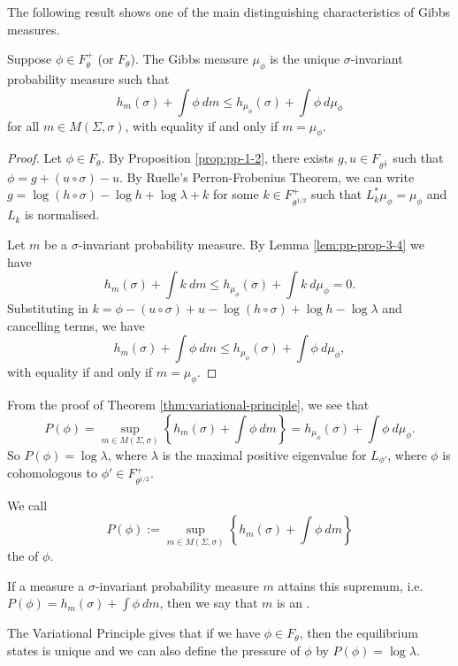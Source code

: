 The following result shows one of the main distinguishing characteristics of Gibbs measures.

\begin{theorem} \label{thm:variational-principle}
	Suppose $\phi \in F_\theta^+$ (or $F_\theta$). The Gibbs measure $\mu_\phi$ is the unique $\sigma$-invariant probability measure such that
	\[
		h_m(\sigma) + \int{\phi\ dm} \leq h_{\mu_\phi}(\sigma) + \int{\phi\ d\mu_\phi}
	\]
	for all $m \in M(\Sigma, \sigma)$, with equality if and only if $m = \mu_\phi$.
	\begin{proof}
		Let $\phi \in F_\theta$. By Proposition \ref{prop:pp-1-2}, there exists $g, u \in F_{\theta^{\frac{1}{2}}}$ such that $\phi = g + (u \circ \sigma) - u$. By Ruelle's Perron-Frobenius Theorem, we can write $g = \log(h \circ \sigma) - \log{h} + \log{\lambda} + k$ for some $k \in F_{\theta^{1/2}}^+$ such that $L_k^*{\mu_\phi} = \mu_\phi$ and $L_k$ is normalised.
		
		Let $m$ be a $\sigma$-invariant probability measure. By Lemma \ref{lem:pp-prop-3-4} we have
		\[
			h_m(\sigma) + \int{k\ dm} \leq h_{\mu_\phi}(\sigma) + \int{k\ d\mu_\phi} = 0.
		\]
		Substituting in $k = \phi - (u \circ \sigma) + u - \log(h \circ \sigma) + \log{h} - \log{\lambda}$ and cancelling terms, we have
		\[
			h_m(\sigma) + \int{\phi\ dm} \leq h_{\mu_\phi}(\sigma) + \int{\phi\ d\mu_\phi},
		\]
		with equality if and only if $m = \mu_\phi$.
	\end{proof}
\end{theorem}

From the proof of Theorem \ref{thm:variational-principle}, we see that
\[
	P(\phi) = \sup_{m \in M(\Sigma, \sigma)}\left\{h_m(\sigma) + \int{\phi\ dm}\right\} = h_{\mu_\phi}(\sigma) + \int{\phi\ d\mu_\phi}.
\]
So $P(\phi) = \log{\lambda}$, where $\lambda$ is the maximal positive eigenvalue for $L_{\phi'}$, where $\phi$ is cohomologous to $\phi' \in F_{\theta^{1 / 2}}^+$.

\begin{definition}
	We call
	\[
		P(\phi) := \sup_{m \in M(\Sigma, \sigma)}\left\{h_m(\sigma) + \int{\phi\ dm}\right\}
	\]
	the  of $\phi$.
	
	If a measure a $\sigma$-invariant probability measure $m$ attains this supremum, i.e. $P(\phi) = h_m(\sigma) + \int{\phi\ dm}$, then we say that $m$ is an .
\end{definition}

The Variational Principle gives that if we have $\phi \in F_\theta$, then the equilibrium states is unique and we can also define the pressure of $\phi$ by $P(\phi) = \log{\lambda}$.

